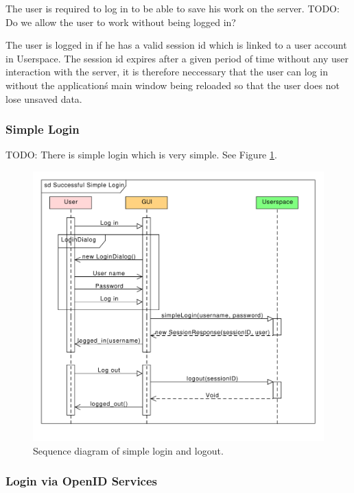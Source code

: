 The user is required to log in to be able to save his work on the server.
TODO: Do we allow the user to work without being logged in?

The user is logged in if he has a valid session id which is linked to a user account in Userspace.
The session id expires after a given period of time without any user interaction with the server,
it is therefore neccessary that the user can log in without the application\'s main window being reloaded so that the user does not lose unsaved data.

\subsubsection{Simple Login}
\label{subsec:simple_login}

TODO: There is simple login which is very simple. See Figure \ref{gui:sd:simple_login}.


\begin{figure}[h]
\begin{center}
\includegraphics[scale=0.65]{figures/simple_login_sequence.pdf}
\end{center}
\caption{Sequence diagram of simple login and logout.}\label{gui:sd:simple_login}
\end{figure}

\subsubsection{Login via OpenID Services}
\label{subsubsec:gui_openid}

